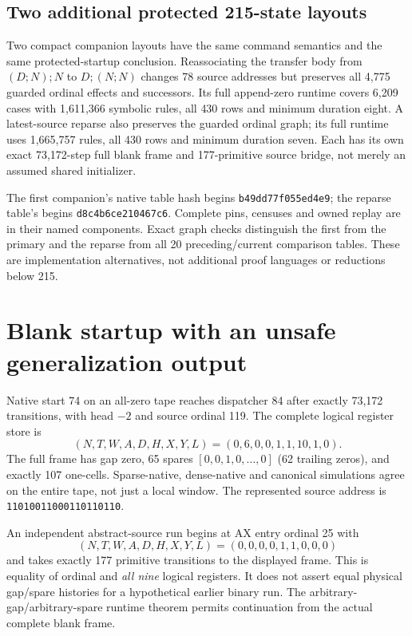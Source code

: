 \documentclass[11pt]{article}
\begin{document}
\subsection*{Two additional protected 215-state layouts}
Two compact companion layouts have the same command semantics and the same protected-startup conclusion. Reassociating the transfer body from $(D;N);N$ to $D;(N;N)$ changes 78 source addresses but preserves all 4,775 guarded ordinal effects and successors. Its full append-zero runtime covers 6,209 cases with 1,611,366 symbolic rules, all 430 rows and minimum duration eight. A latest-source reparse also preserves the guarded ordinal graph; its full runtime uses 1,665,757 rules, all 430 rows and minimum duration seven. Each has its own exact 73,172-step full blank frame and 177-primitive source bridge, not merely an assumed shared initializer.

The first companion's native table hash begins \texttt{b49dd77f055ed4e9}; the reparse table's begins \texttt{d8c4b6ce210467c6}. Complete pins, censuses and owned replay are in their named components. Exact graph checks distinguish the first from the primary and the reparse from all 20 preceding/current comparison tables. These are implementation alternatives, not additional proof languages or reductions below 215.

\section{Blank startup with an unsafe generalization output}
Native start 74 on an all-zero tape reaches dispatcher 84 after exactly 73,172 transitions, with head $-2$ and source ordinal 119. The complete logical register store is
\[
 (N,T,W,A,D,H,X,Y,L)=(0,6,0,0,1,1,10,1,0).
\]
The full frame has gap zero, 65 spares $[0,0,1,0,\ldots,0]$ (62 trailing zeros), and exactly 107 one-cells. Sparse-native, dense-native and canonical simulations agree on the entire tape, not just a local window. The represented source address is \texttt{11010011000110110110}.

An independent abstract-source run begins at AX entry ordinal 25 with
\[
 (N,T,W,A,D,H,X,Y,L)=(0,0,0,0,1,1,0,0,0)
\]
and takes exactly 177 primitive transitions to the displayed frame. This is equality of ordinal and \emph{all nine} logical registers. It does not assert equal physical gap/spare histories for a hypothetical earlier binary run. The arbitrary-gap/arbitrary-spare runtime theorem permits continuation from the actual complete blank frame.
\end{document}

